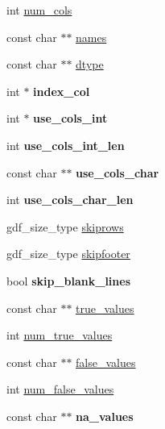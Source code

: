 \begin{DoxyCompactItemize}
\item 
int \hyperlink{structcsv__read__arg_adf9ce0492da45bdbaa63f95bc2313957}{num\+\_\+cols}
\item 
const char $\ast$$\ast$ \hyperlink{structcsv__read__arg_a3247fa972982b72caf56290c93ff5847}{names}
\item 
const char $\ast$$\ast$ \hyperlink{structcsv__read__arg_abbdd5cb96e423e646e0f648182706d48}{dtype}
\item 
int $\ast$ {\bfseries index\+\_\+col}\hypertarget{structcsv__read__arg_a94978f286dff73f4ece96dbb2cec2406}{}\label{structcsv__read__arg_a94978f286dff73f4ece96dbb2cec2406}

\item 
int $\ast$ {\bfseries use\+\_\+cols\+\_\+int}\hypertarget{structcsv__read__arg_aee1f530bc563ef08fafbd26cc9b9bcce}{}\label{structcsv__read__arg_aee1f530bc563ef08fafbd26cc9b9bcce}

\item 
int {\bfseries use\+\_\+cols\+\_\+int\+\_\+len}\hypertarget{structcsv__read__arg_a45489b296d1ac016858678e928690f61}{}\label{structcsv__read__arg_a45489b296d1ac016858678e928690f61}

\item 
const char $\ast$$\ast$ {\bfseries use\+\_\+cols\+\_\+char}\hypertarget{structcsv__read__arg_aaaed56bcf7c52f3eacfffae6f35e0ddb}{}\label{structcsv__read__arg_aaaed56bcf7c52f3eacfffae6f35e0ddb}

\item 
int {\bfseries use\+\_\+cols\+\_\+char\+\_\+len}\hypertarget{structcsv__read__arg_aa134345464d013ad41de369f4b501e7d}{}\label{structcsv__read__arg_aa134345464d013ad41de369f4b501e7d}

\item 
gdf\+\_\+size\+\_\+type \hyperlink{structcsv__read__arg_ac4e846360b19413d1a48f2b816c2692d}{skiprows}
\item 
gdf\+\_\+size\+\_\+type \hyperlink{structcsv__read__arg_a5884681e269f7696cf7cab881056589d}{skipfooter}
\item 
bool {\bfseries skip\+\_\+blank\+\_\+lines}\hypertarget{structcsv__read__arg_a8ae2a9c8dd5f3f7d9268562723364431}{}\label{structcsv__read__arg_a8ae2a9c8dd5f3f7d9268562723364431}

\item 
const char $\ast$$\ast$ \hyperlink{structcsv__read__arg_adb8cdea9df6691421289515d6b7c58eb}{true\+\_\+values}
\item 
int \hyperlink{structcsv__read__arg_addec99ef63c487be0b0cad3ea7f23c20}{num\+\_\+true\+\_\+values}
\item 
const char $\ast$$\ast$ \hyperlink{structcsv__read__arg_af0c32a31f8e26251428207dc939aecff}{false\+\_\+values}
\item 
int \hyperlink{structcsv__read__arg_a330d59c9b97300fe16d48afa461d2d32}{num\+\_\+false\+\_\+values}
\item 
const char $\ast$$\ast$ {\bfseries na\+\_\+values}\hypertarget{structcsv__read__arg_a62f3d48c000cb811658a625d2af0d508}{}\label{structcsv__read__arg_a62f3d48c000cb811658a625d2af0d508}


\end{DoxyCompactItemize}
